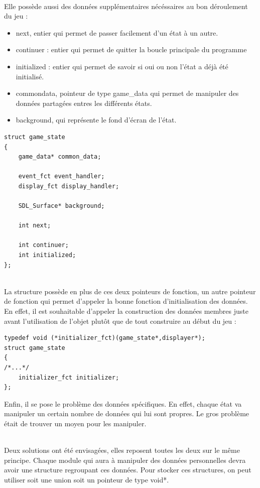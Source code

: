 ~\\
Elle possède aussi des données supplémentaires nécéssaires au bon
déroulement du jeu :

\begin{itemize}
  \item next, entier qui permet de passer facilement d'un état à un autre.
  \item continuer : entier qui permet de quitter la boucle principale
    du programme
  \item initialized : entier qui permet de savoir si oui ou non l'état
    a déjà été initialisé.
  \item common\textunderscore data, pointeur de type game_data qui
    permet de manipuler des données partagées entres les différents
    états.
  \item background, qui représente le fond d'écran de l'état.
\end{itemize}

\begin{lstlisting}
struct game_state
{
    game_data* common_data;

    event_fct event_handler;
    display_fct display_handler;

    SDL_Surface* background;

    int next;

    int continuer;
    int initialized;
};
\end{lstlisting}

~\\

La structure possède en plus de ces deux pointeurs de fonction, un
autre pointeur de fonction qui permet d'appeler la bonne fonction
d'initialisation des données. En effet, il est souhaitable d'appeler
la construction des données membres juste avant l'utilisation de
l'objet plutôt que de tout construire au début du jeu : 
~\\
\begin{lstlisting}
typedef void (*initializer_fct)(game_state*,displayer*);
struct game_state
{
/*...*/
    initializer_fct initializer;
};
\end{lstlisting}

Enfin, il se pose le problème des données spécifiques. En effet,
chaque état va manipuler un certain nombre de données qui lui sont
propres. Le gros problème était de trouver un moyen pour les
manipuler.

~\\
Deux solutions ont été envisagées, elles reposent toutes les deux
sur le même principe. Chaque module qui aura à manipuler des données
personnelles devra avoir une structure regroupant ces données. Pour
stocker ces structures, on peut utiliser soit une union soit un
pointeur de type void*.
~\\

